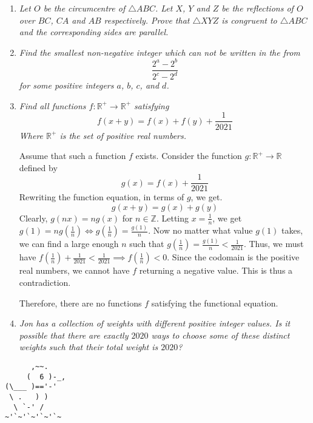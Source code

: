 \documentclass{article}
\begin{document}
\begin{enumerate}[1.]
\item %
{\itshape Let $O$ be the circumcentre of $\triangle ABC$. Let $X$, $Y$ and $Z$ be the reflections of $O$ over $BC$, $CA$ and $AB$ respectively. Prove that $\triangle XYZ$ is congruent to $\triangle ABC$ and the corresponding sides are parallel.}


\item %
{\itshape Find the smallest non-negative integer which can not be written in the from
\[
  \frac{2^a - 2^b}{2^c - 2^d}
\]
for some positive integers $a$, $b$, $c$, and $d$.}


\item %
{\itshape Find all functions $f: \mathbb{R}^+ \rightarrow \mathbb{R}^+$ satisfying 
$$f(x + y) = f(x) + f(y) + \frac{1}{2021} $$
Where $\mathbb{R}^+$ is the set of positive real numbers. }

Assume that such a function $f$ exists. Consider the function $g: \mathbb{R}^+ \rightarrow \mathbb{R}$ defined by 
$$g(x) = f(x) + \frac{1}{2021}$$
Rewriting the function equation, in terms of $g$, we get. 
$$g(x + y) = g(x) + g(y)$$
Clearly, $g(nx) = ng(x)$ for $n \in \mathbb{Z}$. Letting $x = \frac{1}{n}$, we get $g(1) = ng(\frac{1}{n}) \iff g(\frac{1}{n}) = \frac{g(1)}{n}$. Now no matter what value $g(1)$ takes, we can find a large enough $n$ such that $g(\frac{1}{n}) = \frac{g(1)}{n} < \frac{1}{2021}$. Thus, we must have $f(\frac{1}{n}) + \frac{1}{2021} < \frac{1}{2021} \implies f(\frac{1}{n}) < 0$. Since the codomain is the positive real numbers, we cannot have $f$ returning a negative value. This is thus a contradiction.

Therefore, there are no functions $f$ satisfying the functional equation.


\item %
{\itshape Jon has a collection of weights with different positive integer values. Is it possible that there are exactly $2020$ ways to choose some of these distinct weights such that their total weight is $2020$?}

\end{enumerate}


\vfill
\centering
\begin{BVerbatim}
      ,~~.
     (  6 )-_,
(\___ )=='-'
 \ .   ) )
  \ `-' /    
~'`~'`~'`~'`~
\end{BVerbatim}
\end{document}
